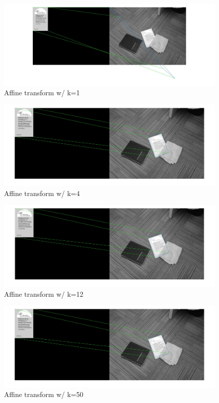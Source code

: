 \documentclass[]{article}
\begin{document}
\begin{figure}[h!]
\centering
\includegraphics[width=1.35\textwidth]{img/2c-k1.jpg}
\caption{Affine transform w/ k=1}
\end{figure}
\begin{figure}[h!]
\centering
\includegraphics[width=1.35\textwidth]{img/2c-k4.jpg}
\caption{Affine transform w/ k=4}
\end{figure}
\begin{figure}[h!]
\centering
\includegraphics[width=1.35\textwidth]{img/2c-k12.jpg}
\caption{Affine transform w/ k=12}
\end{figure}
\begin{figure}[h!]
\centering
\includegraphics[width=1.35\textwidth]{img/2c-k50.jpg}
\caption{Affine transform w/ k=50}
\end{figure}
\end{document}
